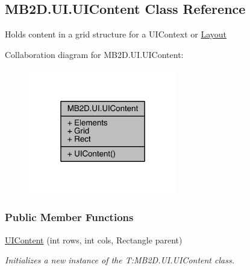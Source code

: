 \hypertarget{class_m_b2_d_1_1_u_i_1_1_u_i_content}{}\subsection{M\+B2\+D.\+U\+I.\+U\+I\+Content Class Reference}
\label{class_m_b2_d_1_1_u_i_1_1_u_i_content}


Holds content in a grid structure for a U\+I\+Context or \hyperlink{class_m_b2_d_1_1_u_i_1_1_layout}{Layout}  




Collaboration diagram for M\+B2\+D.\+U\+I.\+U\+I\+Content\+:
\nopagebreak
\begin{figure}[H]
\begin{center}
\leavevmode
\includegraphics[width=184pt]{class_m_b2_d_1_1_u_i_1_1_u_i_content__coll__graph}
\end{center}
\end{figure}
\subsubsection*{Public Member Functions}
\begin{DoxyCompactItemize}
\item 
\hyperlink{class_m_b2_d_1_1_u_i_1_1_u_i_content_a80e7f519af0f835fa9912ffa49d76e48}{U\+I\+Content} (int rows, int cols, Rectangle parent)
\begin{DoxyCompactList}\small\item\em Initializes a new instance of the T\+:\+M\+B2\+D.\+U\+I.\+U\+I\+Content class. \end{DoxyCompactList}\end{DoxyCompactItemize}
